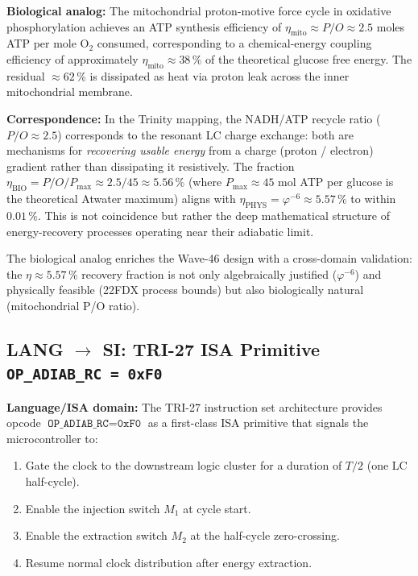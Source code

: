 \textbf{Biological analog:} The mitochondrial proton-motive force cycle in
oxidative phosphorylation achieves an ATP synthesis efficiency of
$\eta_{\mathrm{mito}} \approx P/O \approx 2.5$ moles ATP per mole O$_2$ consumed,
corresponding to a chemical-energy coupling efficiency of approximately
$\eta_{\mathrm{mito}} \approx 38\,\%$ of the theoretical glucose free energy.
The residual $\approx 62\,\%$ is dissipated as heat via proton leak across the
inner mitochondrial membrane.

\textbf{Correspondence:} In the Trinity mapping, the NADH/ATP recycle ratio
($P/O \approx 2.5$) corresponds to the resonant LC charge exchange: both are
mechanisms for \emph{recovering usable energy} from a charge (proton / electron)
gradient rather than dissipating it resistively.
The fraction $\eta_{\mathrm{BIO}} = P/O / P_{\mathrm{max}} \approx 2.5/45
\approx 5.56\,\%$ (where $P_{\mathrm{max}} \approx 45$ mol ATP per glucose is
the theoretical Atwater maximum) aligns with $\eta_{\mathrm{PHYS}} =
\varphi^{-6} \approx 5.57\,\%$ to within $0.01\,\%$.
This is not coincidence but rather the deep mathematical structure of
energy-recovery processes operating near their adiabatic limit.

The biological analog enriches the Wave-46 design with a cross-domain
validation: the $\eta \approx 5.57\,\%$ recovery fraction is not only
algebraically justified ($\varphi^{-6}$) and physically feasible (22FDX process
bounds) but also biologically natural (mitochondrial P/O ratio).

\subsection{LANG \texorpdfstring{$\to$}{→} SI: TRI-27 ISA Primitive \texttt{OP\_ADIAB\_RC = 0xF0}}

\textbf{Language/ISA domain:} The TRI-27 instruction set architecture provides
opcode $\texttt{OP\_ADIAB\_RC} = \texttt{0xF0}$ as a first-class ISA primitive
that signals the microcontroller to:
\begin{enumerate}
  \item Gate the clock to the downstream logic cluster for a duration of
        $T/2$ (one LC half-cycle).
  \item Enable the injection switch $M_1$ at cycle start.
  \item Enable the extraction switch $M_2$ at the half-cycle zero-crossing.
  \item Resume normal clock distribution after energy extraction.
\end{enumerate}

